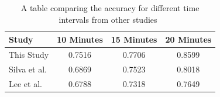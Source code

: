 \begin{table}[h]
    \centering
    \begin{tabular}{lccc}
        \toprule
        \textbf{Study} & \textbf{10 Minutes} & \textbf{15 Minutes} & \textbf{20 Minutes} \\
        \midrule
        This Study & 0.7516 & 0.7706 & 0.8599  \\
        Silva et al. & 0.6869 & 0.7523 & 0.8018 \\
        Lee et al. & 0.6788 & 0.7318 & 0.7649  \\
        \bottomrule
    \end{tabular}
    \caption{A table comparing the accuracy for different time intervals from other studies~\citep{silva2018continuous, lee2020predicting}}
    \label{tab:LitCompare}
\end{table}